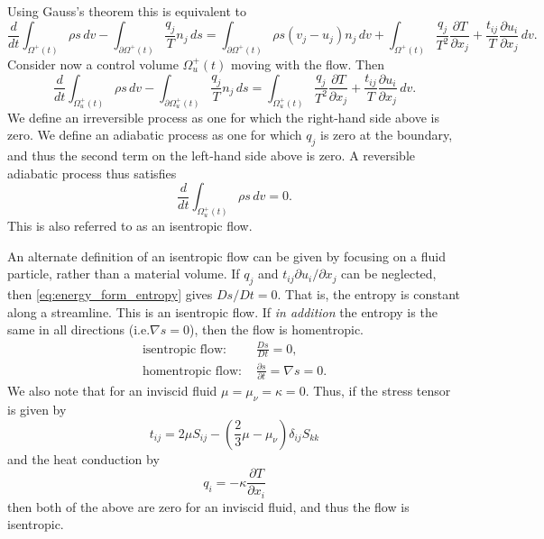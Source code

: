 \documentclass[oneside,a4paper,11pt]{report}
\begin{document}
Using Gauss's theorem this is equivalent to
\begin{equation}
    \frac{d}{dt} \int_{\Omega^+(t)} \rho s \, dv - \int_{\partial \Omega^+(t)} \frac{q_j}{T} n_j \,ds = \int_{\partial \Omega^+(t)} \rho s \left (v_j - u_j \right ) n_j \, dv + \int_{\Omega^+(t)} \frac{q_j}{T^2}\frac{\partial T}{\partial x_j} + \frac{t_{ij}}{T} \frac{\partial u_i}{\partial x_j} \, dv.
\end{equation}
Consider now a control volume $\Omega^+_u(t)$ moving with the flow. Then
\begin{equation}
    \frac{d}{dt} \int_{\Omega^+_u(t)} \rho s \, dv - \int_{\partial \Omega^+_u(t)} \frac{q_j}{T} n_j \,ds = \int_{\Omega^+_u(t)} \frac{q_j}{T^2}\frac{\partial T}{\partial x_j} + \frac{t_{ij}}{T} \frac{\partial u_i}{\partial x_j} \, dv.
\end{equation}
We define an irreversible process as one for which the right-hand side above is zero. We define an adiabatic process as one for which $q_j$ is zero at the boundary, and thus the second term on the left-hand side above is zero. A reversible adiabatic process thus satisfies
\begin{equation}
    \frac{d}{dt} \int_{\Omega^+_u(t)} \rho s \, dv = 0.
\end{equation}
This is also referred to as an isentropic flow. 

An alternate definition of an isentropic flow can be given by focusing on a fluid particle, rather than a material volume. If $q_j$ and $t_{ij} \partial u_i / \partial x_j$ can be neglected, then \cref{eq:energy_form_entropy} gives $Ds/Dt = 0$. That is, the entropy is constant along a streamline. This is an isentropic flow. If \textit{in addition} the entropy is the same in all directions (i.e.\@ $\nabla s = 0$), then the flow is homentropic. 
\begin{align}
    \text{isentropic flow:   }& \frac{Ds}{Dt} = 0, \\
    \text{homentropic flow:   }& \frac{\partial s}{\partial t} = \nabla s = 0.
\end{align}
We also note that for an inviscid fluid $\mu = \mu_\nu = \kappa = 0$. Thus, if the stress tensor is given by
\begin{equation}
    t_{ij} = 2 \mu S_{ij} - \left( \frac{2}{3} \mu - \mu_\nu \right) \delta_{ij} S_{kk}
\end{equation}
and the heat conduction by
\begin{equation}
    q_i = -\kappa \frac{\partial T}{\partial x_i}
\end{equation}
then both of the above are zero for an inviscid fluid, and thus the flow is isentropic.
\end{document}
